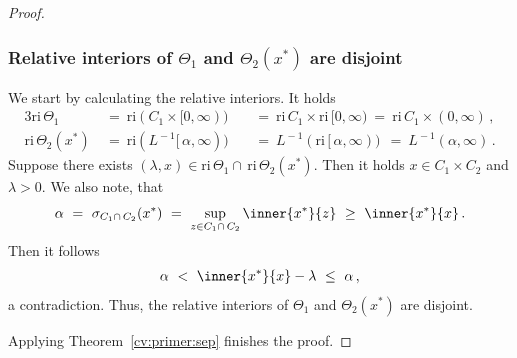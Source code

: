 \begin{proof}
  \subsubsection*{Relative interiors of
  $ \Theta_1 $ and $ \Theta_2(x^*) $
  are disjoint}
  We start by calculating the relative interiors. It holds
  \begin{alignat*}{3}
    \mathrm{ri}\,
    \Theta_1
    &
    \ 
    =
    \ 
    \mathrm{ri}
    ( C_1\times [0,\infty) )
    &&
    \ 
    =
    \ 
    \mathrm{ri}\,
    C_1
    \!
    \times
    \mathrm{ri}\,
    [0,\infty)
    \ 
    =
    \ 
    \mathrm{ri}\,
    C_1
    \!
    \times
    (0,\infty)
    \,,
    \\
    \mathrm{ri}\,
    \Theta_2(x^*)
    & 
    \ 
    =
    \ 
    \mathrm{ri}
    (
    L^{\!-1}
    [\,\alpha,\infty)
    )
    &&
    \ 
    =
    \ 
    L^{\!-1}
    (
    \mathrm{ri}\,
    [\,\alpha,\infty)
    )
    \ 
    \ 
    =
    \ 
    L^{\!-1}
    (\alpha,\infty)
    \,.
  \end{alignat*}
  Suppose there exists
  $ (\lambda,x) \in
    \mathrm{ri}\, 
    \Theta_1
    \cap
    \,
    \mathrm{ri}\, 
    \Theta_2(x^*)
  $.
  Then it holds 
  $ x \in C_1\!\times C_2 $
  and 
  $ \lambda >0 $.
  We also note, that
  \begin{gather*}
  \alpha
  \ 
  =
  \ 
  \sigma_{C_1\cap\, C_2}(x^*)
    \ 
  =
    \ 
  \sup_{z \in C_1\cap\, C_2}
  \inner
  {x^*}
  {z}
  \ 
  \ge
  \ 
  \inner
  {x^*}
  {x}
  \,.
  \end{gather*}
  Then it follows
  \begin{gather*}
    \alpha
    \ 
    <
    \ 
  \inner
  {x^*}
  {x}
  - \lambda
    \ 
  \le
    \ 
  \alpha\,,
  \end{gather*}
  a contradiction.
  Thus, the relative interiors of
  $ \Theta_1 $ and $ \Theta_2(x^*) $
  are disjoint.

  Applying Theorem~\ref{cv:primer:sep} finishes the proof.
\end{proof}


